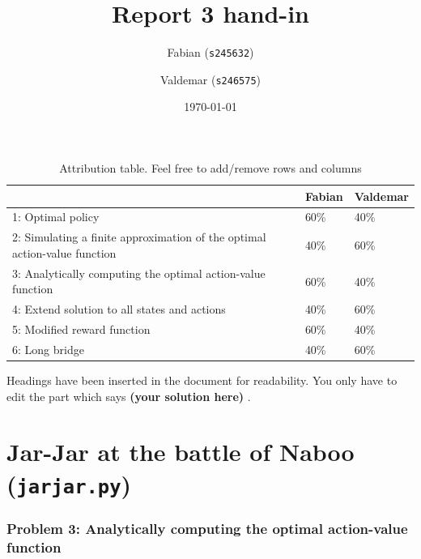 \documentclass[12pt,twoside]{article}
\title{ Report 3 hand-in }
\date{ \today }
\author{Fabian (\texttt{s245632})\and  Valdemar (\texttt{s246575})}
\newcommand\redt[1]{ {\textcolor[rgb]{0.60, 0.00, 0.00}{\textbf{ #1} } } }
\newcommand{\yoursolution}{ \redt{(your solution here) } }
\begin{document}
\maketitle

\begin{table}[ht!]
\caption{Attribution table. Feel free to add/remove rows and columns}
\begin{tabular}{lll}
\toprule
                                                                           & Fabian   &  Valdemar \\
\midrule
 1: Optimal policy                                                         & 60\%  & 40\%  \\
 2: Simulating a finite approximation of the optimal action-value function & 40\%  & 60\%  \\
 3: Analytically computing the optimal action-value function               & 60\%  & 40\%  \\
 4: Extend solution to all states and actions                              & 40\%  & 60\%  \\
 5: Modified reward function                                               & 60\%  & 40\%  \\
 6: Long bridge                                                            & 40\%  & 60\%  \\
\bottomrule
\end{tabular}
\end{table}


Headings have been inserted in the document for readability. You only have to edit the part which says \yoursolution.

\newpage
\section{Jar-Jar at the battle of Naboo (\texttt{jarjar.py})}
\subsubsection*{{\color{red}Problem 3:  Analytically computing the optimal action-value function}}
\end{document}
